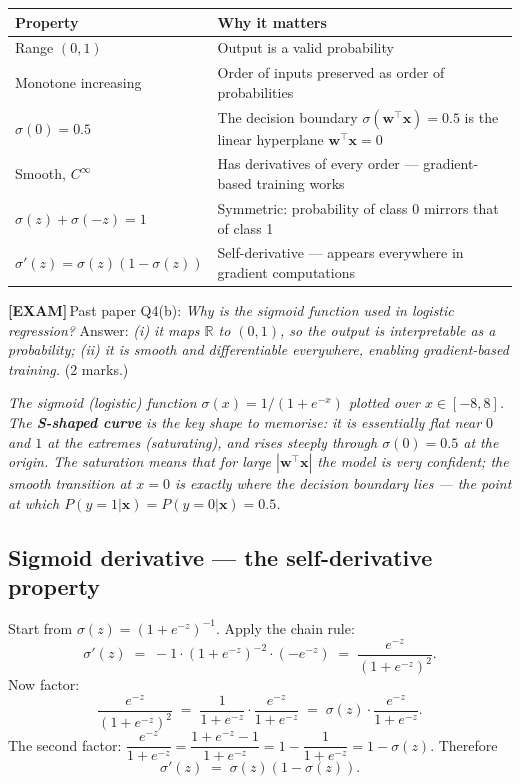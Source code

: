 \documentclass[11pt, a4paper]{article}
\newcommand{\thead}[1]{\textbf{#1}}
\newcommand{\examflag}{\textcolor{tipBd}{\textbf{[EXAM]}}\,}
\newcommand{\doflag}{\textcolor{defBd}{\textbf{[DO]}}\,}
\begin{document}
\begin{tabularx}{\linewidth}{@{}lX@{}}
\toprule
\thead{Property} & \thead{Why it matters} \\
\midrule
Range $(0,1)$           & Output is a valid probability \\
Monotone increasing     & Order of inputs preserved as order of probabilities \\
$\sigma(0) = 0.5$       & The decision boundary $\sigma(\mathbf{w}^\top\mathbf{x}) = 0.5$ is the linear hyperplane $\mathbf{w}^\top\mathbf{x} = 0$ \\
Smooth, $C^\infty$       & Has derivatives of every order — gradient-based training works \\
$\sigma(z) + \sigma(-z) = 1$ & Symmetric: probability of class 0 mirrors that of class 1 \\
$\sigma'(z) = \sigma(z)(1-\sigma(z))$ & Self-derivative — appears everywhere in gradient computations \\
\bottomrule
\end{tabularx}

\examflag{}Past paper Q4(b): \emph{Why is the sigmoid function used in logistic regression?} Answer: \emph{(i) it maps $\mathbb{R}$ to $(0,1)$, so the output is interpretable as a probability; (ii) it is smooth and differentiable everywhere, enabling gradient-based training.} (2 marks.)

\begin{center}

\footnotesize\textit{The sigmoid (logistic) function $\sigma(x) = 1/(1+e^{-x})$ plotted over $x \in [-8, 8]$. The \textbf{S-shaped curve} is the key shape to memorise: it is essentially flat near $0$ and $1$ at the extremes (saturating), and rises steeply through $\sigma(0) = 0.5$ at the origin. The saturation means that for large $|\mathbf{w}^\top\mathbf{x}|$ the model is very confident; the smooth transition at $x=0$ is exactly where the decision boundary lies --- the point at which $P(y=1|\mathbf{x}) = P(y=0|\mathbf{x}) = 0.5$.}
\end{center}

\subsection{Sigmoid derivative — the self-derivative property}

\begin{exbox}[\doflag{}Derive $\sigma'(z) = \sigma(z)(1-\sigma(z))$]
Start from $\sigma(z) = (1+e^{-z})^{-1}$. Apply the chain rule:
\[
\sigma'(z) \;=\; -1\cdot(1+e^{-z})^{-2} \cdot (-e^{-z}) \;=\; \frac{e^{-z}}{(1+e^{-z})^2}.
\]
Now factor:
\[
\frac{e^{-z}}{(1+e^{-z})^2} \;=\; \frac{1}{1+e^{-z}} \cdot \frac{e^{-z}}{1+e^{-z}} \;=\; \sigma(z) \cdot \frac{e^{-z}}{1+e^{-z}}.
\]
The second factor: $\dfrac{e^{-z}}{1+e^{-z}} = \dfrac{1+e^{-z}-1}{1+e^{-z}} = 1 - \dfrac{1}{1+e^{-z}} = 1-\sigma(z)$.
Therefore
\[
\boxed{\;\sigma'(z) \;=\; \sigma(z)(1-\sigma(z)).\;}
\]
\end{exbox}
\end{document}
